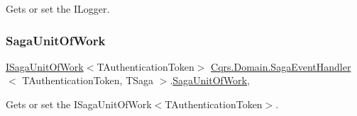 Gets or set the I\+Logger. 

\mbox{\label{classCqrs_1_1Domain_1_1SagaEventHandler_a4cab45aafb7b71534aae7cbe077d1129_a4cab45aafb7b71534aae7cbe077d1129}} 
\subsubsection{\texorpdfstring{Saga\+Unit\+Of\+Work}{SagaUnitOfWork}}
{\footnotesize\ttfamily \hyperlink{interfaceCqrs_1_1Domain_1_1ISagaUnitOfWork}{I\+Saga\+Unit\+Of\+Work}$<$T\+Authentication\+Token$>$ \hyperlink{classCqrs_1_1Domain_1_1SagaEventHandler}{Cqrs.\+Domain.\+Saga\+Event\+Handler}$<$ T\+Authentication\+Token, T\+Saga $>$.\hyperlink{classCqrs_1_1Domain_1_1SagaUnitOfWork}{Saga\+Unit\+Of\+Work}\hspace{0.3cm}{\ttfamily [get]}, {\ttfamily [protected]}}



Gets or set the I\+Saga\+Unit\+Of\+Work$<$\+T\+Authentication\+Token$>$. 

